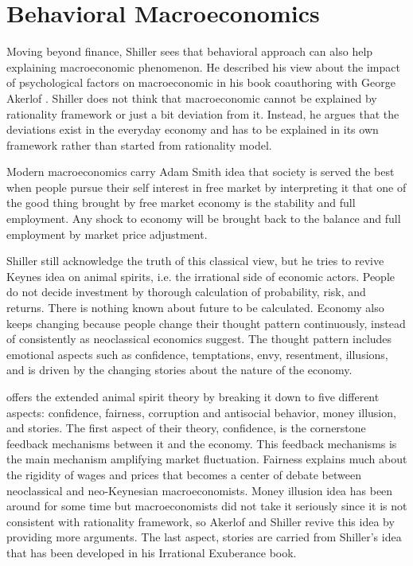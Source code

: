 \documentclass[a4paper, 12pt]{article}
\begin{document}
\section{Behavioral Macroeconomics}

Moving beyond finance, Shiller sees that behavioral approach can also help explaining macroeconomic phenomenon. He described his view about the impact of psychological factors on macroeconomic in his book coauthoring with George Akerlof \citep{akerlof2010animal}. Shiller does not think that macroeconomic cannot be explained by rationality framework or just a bit deviation from it.  Instead, he argues that the deviations exist in the everyday economy and has to be explained in its own framework rather than started from rationality model.

Modern macroeconomics carry Adam Smith idea that society is served the best when people pursue their self interest in free market by interpreting it that one of the good thing brought by free market economy is the stability and full employment. Any shock to economy will be brought back to the balance and full employment by market price adjustment.

Shiller still acknowledge the truth of this classical view, but he tries to revive Keynes idea on animal spirits, i.e. the irrational side of economic actors. People do not decide investment by thorough calculation of probability, risk, and returns. There is nothing known about future to be calculated. Economy also keeps changing because people change their thought pattern continuously, instead of consistently as neoclassical economics suggest. The thought pattern includes emotional aspects such as confidence, temptations, envy, resentment, illusions, and is driven by the changing stories about the nature of the economy.

\citet{akerlof2010animal} offers the extended animal spirit theory by breaking it down to five different aspects: confidence, fairness, corruption and antisocial behavior, money illusion, and stories. The first aspect of their theory, confidence, is the cornerstone feedback mechanisms between it and the economy. This feedback mechanisms is the main mechanism amplifying market fluctuation. Fairness explains much about the rigidity of wages and prices that becomes a center of debate between neoclassical and neo-Keynesian macroeconomists. Money illusion idea has been around for some time but macroeconomists did not take it seriously since it is not consistent with rationality framework, so Akerlof and Shiller revive this idea by providing more arguments. The last aspect, stories are carried from Shiller's idea that has been developed in his Irrational Exuberance book.
\end{document}
